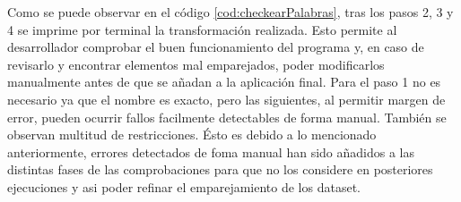 Como se puede observar en el código \ref{cod:checkearPalabras}, tras los pasos 2, 3 y 4 se imprime por terminal la transformación realizada. Esto permite al desarrollador comprobar el buen funcionamiento del programa y, en caso de revisarlo y encontrar elementos mal emparejados, poder modificarlos manualmente antes de que se añadan a la aplicación final. Para el paso 1 no es necesario ya que el nombre es exacto, pero las siguientes, al permitir margen de error, pueden ocurrir fallos facilmente detectables de forma manual.
También se observan multitud de restricciones. Ésto es debido a lo mencionado anteriormente, errores detectados de foma manual han sido añadidos a las distintas fases de las comprobaciones para que no los considere en posteriores ejecuciones y asi poder refinar el emparejamiento de los dataset.


